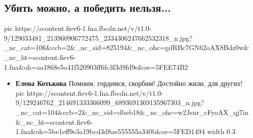  
 
 
 
 

\subsection{Убить можно, а победить нельзя...}

\ifcmt
pic https://scontent.fiev6-1.fna.fbcdn.net/v/t1.0-9/129033481_213960906772475_2334306247662532318_n.jpg?_nc_cat=106&ccb=2&_nc_sid=825194&_nc_ohc=gdRBc7GN62oAX8Bdz0w&_nc_ht=scontent.fiev6-1.fna&oh=aa1868e5a41f520903ff6fc3f3d9fd9e&oe=5FEE74B2
\fi

\begin{itemize}
\item \textbf{Елена Котькова}
Помним, гордимся, скорбим!  Достойно жили, для других!
\ifcmt
pic https://scontent.fiev6-1.fna.fbcdn.net/v/t1.0-9/129246762_214691333366099_6893691369135967303_n.jpg?_nc_cat=104&ccb=2&_nc_sid=dbeb18&_nc_ohc=w2Jsnr_cFyoAX_qj7in&_nc_ht=scontent.fiev6-1.fna&oh=5be1eff9e3a19bcd3d8ae555555a340b&oe=5FED1494
width 0.3
\fi
\end{itemize}
